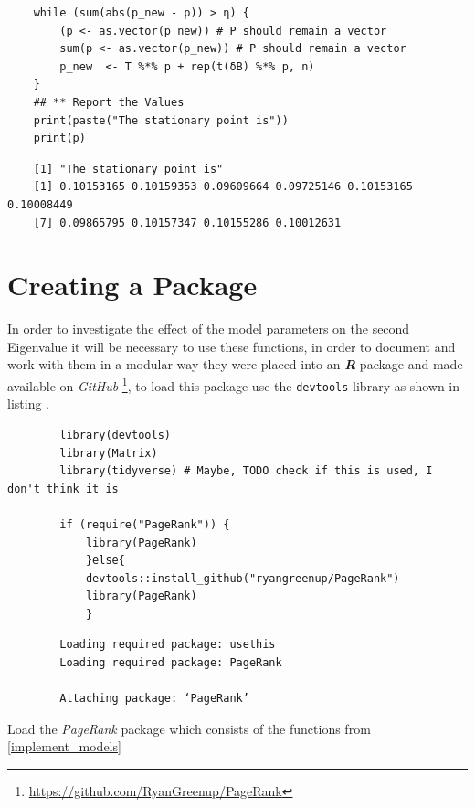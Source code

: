 \documentclass[11pt, twoside]{report}
\begin{document}
\begin{enumerate}
\begin{tcolorbox}
\begin{verbatim}
    while (sum(abs(p_new - p)) > η) {
        (p <- as.vector(p_new)) # P should remain a vector
        sum(p <- as.vector(p_new)) # P should remain a vector
        p_new  <- T %*% p + rep(t(δB) %*% p, n)
    }
    ## ** Report the Values
    print(paste("The stationary point is"))
    print(p)
    \end{verbatim}
\tcblower
    \begin{verbatim}
    [1] "The stationary point is"
    [1] 0.10153165 0.10159353 0.09609664 0.09725146 0.10153165 0.10008449
    [7] 0.09865795 0.10157347 0.10155286 0.10012631
    \end{verbatim}
\end{tcolorbox}

\end{enumerate}

\newpage
\section{Creating a Package}
\label{create-package}
In order to investigate the effect of the model parameters on the second
Eigenvalue it will be necessary to use these functions, in order to document and
work with them in a modular way they were placed into an \textbf{\emph{R}} package and made
available on \emph{GitHub}  \footnote{\url{https://github.com/RyanGreenup/PageRank}}, to load this package use the \texttt{devtools} library as shown in listing .

\begin{listing}[htbp]
    \begin{tcolorbox}
        \begin{verbatim}
        library(devtools)
        library(Matrix)
        library(tidyverse) # Maybe, TODO check if this is used, I don't think it is

        if (require("PageRank")) {
            library(PageRank)
            }else{
            devtools::install_github("ryangreenup/PageRank")
            library(PageRank)
            }

        \end{verbatim}
    \tcblower
        \begin{verbatim}
        Loading required package: usethis
        Loading required package: PageRank

        Attaching package: ‘PageRank’
        \end{verbatim}
    \end{tcolorbox}
\caption{\label{}Load the \emph{PageRank} package which consists of the functions from \ref{implement_models}}
\end{listing}
\end{document}
